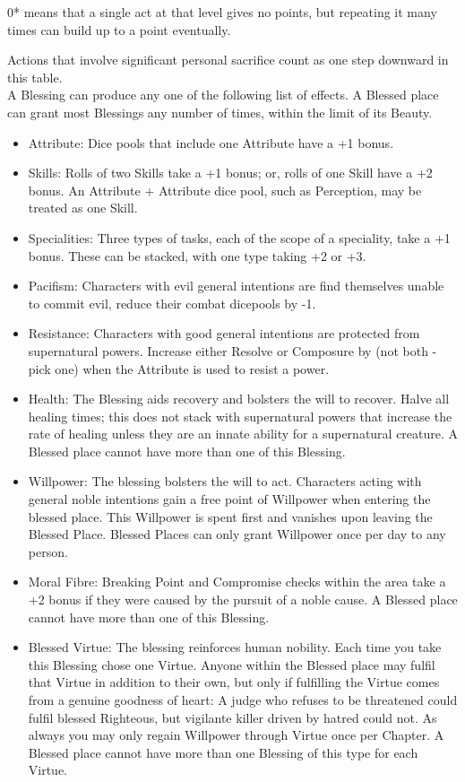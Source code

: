 0* means that a single act at that level gives no points, but repeating it many times can build up to a point eventually.

Actions that involve significant personal sacrifice count as one step downward in this table.\\

\noindent A Blessing can produce any one of the following list of effects. A Blessed place can grant most Blessings any number of times, within the limit of its Beauty.

\begin{itemize}    \item Attribute: Dice pools that include one Attribute have a +1 bonus.
 \item    Skills: Rolls of two Skills take a +1 bonus; or, rolls of one Skill have a +2 bonus. An Attribute + Attribute dice pool, such as Perception, may be treated as one Skill.
\item     Specialities: Three types of tasks, each of the scope of a speciality, take a +1 bonus. These can be stacked, with one type taking +2 or +3.
\item     Pacifism: Characters with evil general intentions are find themselves unable to commit evil, reduce their combat dicepools by -1.
\item     Resistance: Characters with good general intentions are protected from supernatural powers. Increase either Resolve or Composure by (not both - pick one) when the Attribute is used to resist a power.
 \item    Health: The Blessing aids recovery and bolsters the will to recover. Halve all healing times; this does not stack with supernatural powers that increase the rate of healing unless they are an innate ability for a supernatural creature. A Blessed place cannot have more than one of this Blessing.
\item     Willpower: The blessing bolsters the will to act. Characters acting with general noble intentions gain a free point of Willpower when entering the blessed place. This Willpower is spent first and vanishes upon leaving the Blessed Place. Blessed Places can only grant Willpower once per day to any person.
 \item    Moral Fibre: Breaking Point and Compromise checks within the area take a +2 bonus if they were caused by the pursuit of a noble cause. A Blessed place cannot have more than one of this Blessing.
\item     Blessed Virtue: The blessing reinforces human nobility. Each time you take this Blessing chose one Virtue. Anyone within the Blessed place may fulfil that Virtue in addition to their own, but only if fulfilling the Virtue comes from a genuine goodness of heart: A judge who refuses to be threatened could fulfil blessed Righteous, but vigilante killer driven by hatred could not. As always you may only regain Willpower through Virtue once per Chapter. A Blessed place cannot have more than one Blessing of this type for each Virtue.
\end{itemize} 


